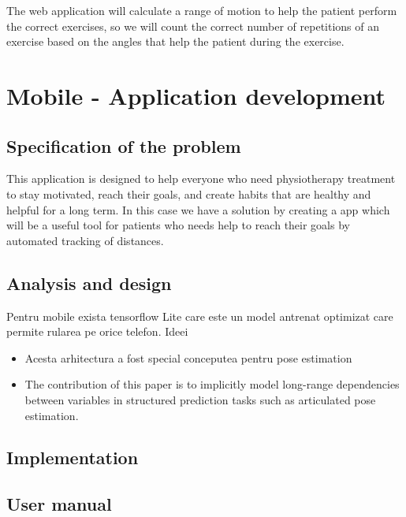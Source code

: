 The web application will calculate a range of motion to help the patient perform the correct exercises, so we will count the correct number of repetitions of an exercise based on the angles that help the patient during the exercise.



\section{Mobile - Application development}

\subsection{Specification of the problem}
 
\par This application is designed to help everyone who need physiotherapy treatment to stay motivated,
 reach their goals, and create habits that are healthy and helpful for a long term. 
 In this case we have a solution by creating a app which will be a useful tool for patients who needs help 
 to reach their goals by automated tracking of distances.
 
 
\subsection{Analysis and design}
Pentru mobile exista tensorflow Lite care este un model antrenat optimizat care permite rularea pe orice telefon.
 Ideei \cite{DBLP:journals/corr/WeiRKS16}
\begin{itemize}
    \item Acesta arhitectura a fost special conceputea pentru pose estimation
    \item The contribution of this paper is to implicitly model long-range dependencies between variables in structured prediction tasks such as articulated pose estimation.
\end{itemize}


\subsection{Implementation}
\subsection{User manual}

